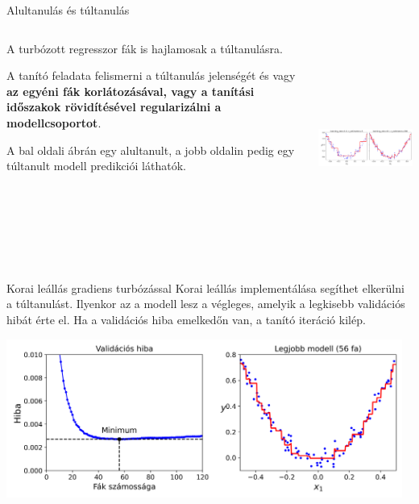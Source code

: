\documentclass[english, aspectratio=169]{beamer}
\begin{document}
\begin{frame}{Alultanulás és túltanulás}
\begin{columns}
\begin{column}{.4\textwidth}
A turbózott regresszor fák is hajlamosak a túltanulásra.\par\medskip
A tanító feladata felismerni a túltanulás jelenségét és vagy \textbf{az egyéni fák korlátozásával, vagy a tanítási időszakok rövidítésével regularizálni a modellcsoportot}.\par\medskip
A bal oldali ábrán egy alultanult, a jobb oldalin pedig egy túltanult modell predikciói láthatók.
\end{column}
\begin{column}{.6\textwidth}
\begin{center}
\includegraphics[width=9cm, height=7cm, keepaspectratio]{images/ensemble_14.png}
\end{center}
\end{column}
\end{columns}
\end{frame}

\begin{frame}{Korai leállás gradiens turbózással}
Korai leállás implementálása segíthet elkerülni a túltanulást. Ilyenkor az a modell lesz a végleges, amelyik a legkisebb validációs hibát érte el. Ha a validációs hiba emelkedőn van, a tanító iteráció kilép. 
\begin{center}
\includegraphics[width=13cm, keepaspectratio]{images/ensemble_15.png}
\end{center}
\end{frame}
\end{document}
